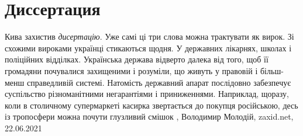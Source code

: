  
 
 
 
 
\chapter{Диссертация}
\label{sec:slova.dissertacia}

Кива захистив \emph{дисертацію}. Уже самі ці три слова можна трактувати як вирок. Зі
схожими вироками українці стикаються щодня. У державних лікарнях, школах і
поліційних відділках. Українська держава відверто далека від того, щоб її
громадяни почувалися захищеними і розуміли, що живуть у правовій і більш-менш
справедливій системі. Натомість державний апарат послідовно забезпечує
суспільство різноманітними негарантіями і приниженнями. Наприклад, щоразу, коли
в столичному супермаркеті касирка звертається до покупця російською, десь із
тропосфери можна почути глузливий смішок
, 
Володимир Молодій, zaxid.net, 22.06.2021


